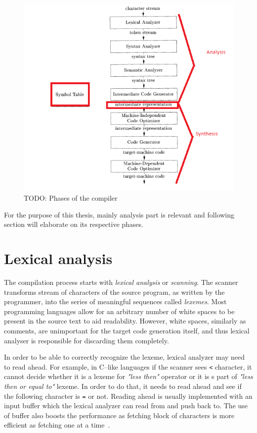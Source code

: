 \documentclass[
  digital, %
  table,   %
  lof,     %
  lot,     %
  oneside,
]{fithesis3}
\begin{document}
\begin{figure}[h!]
		\centering
			\includegraphics[scale=0.75]{img/compiler-phases}
		\caption{TODO: Phases of the compiler~\cite{dragon-book}}
		\label{fig:compiler-phases}
\end{figure}

For the purpose of this thesis, mainly analysis part is relevant and following section will elaborate on its respective phases.

  \section{Lexical analysis}
The compilation process starts with \textit{lexical analysis} or \textit{scanning}. The scanner transforms stream of characters of the source program, as written by the programmer, into the series of meaningful sequences called \textit{lexemes}. Most programming languages allow for an arbitrary number of white spaces to be present in the source text to aid readability. However, white spaces, similarly as comments, are unimportant for the target code generation itself, and thus lexical analyser is responsible for discarding them completely.

In order to be able to correctly recognize the lexeme, lexical analyzer may need to read ahead. For example, in C--like languages if the scanner sees \texttt{<} character, it cannot decide whether it is a lexeme for \textit{"less then"} operator or it is s part of \textit{"less then or equal to"} lexeme. In order to do that, it needs to read ahead and see if the following character is \texttt{=} or not. Reading ahead is usually implemented with an input buffer which the lexical analyzer can read from and push back to. The use of buffer also boosts the performance as fetching block of characters is more efficient as fetching one at a time~\cite{dragon-book}.
\end{document}
